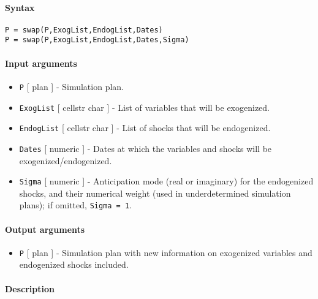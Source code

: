 


	\paragraph{Syntax}

\begin{verbatim}
P = swap(P,ExogList,EndogList,Dates)
P = swap(P,ExogList,EndogList,Dates,Sigma)
\end{verbatim}

\paragraph{Input arguments}

\begin{itemize}
\item
  \texttt{P} {[} plan {]} - Simulation plan.
\item
  \texttt{ExogList} {[} cellstr \textbar{} char {]} - List of variables
  that will be exogenized.
\item
  \texttt{EndogList} {[} cellstr \textbar{} char {]} - List of shocks
  that will be endogenized.
\item
  \texttt{Dates} {[} numeric {]} - Dates at which the variables and
  shocks will be exogenized/endogenized.
\item
  \texttt{Sigma} {[} numeric {]} - Anticipation mode (real or imaginary)
  for the endogenized shocks, and their numerical weight (used in
  underdetermined simulation plans); if omitted, \texttt{Sigma = 1}.
\end{itemize}

\paragraph{Output arguments}

\begin{itemize}
\itemsep1pt\parskip0pt
\item
  \texttt{P} {[} plan {]} - Simulation plan with new information on
  exogenized variables and endogenized shocks included.
\end{itemize}

\paragraph{Description}

